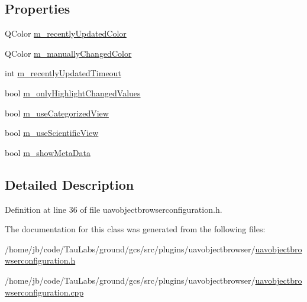 \subsection*{\-Properties}
\begin{DoxyCompactItemize}
\item 
\-Q\-Color \hyperlink{group___u_a_v_object_browser_plugin_ga37ba368816fa79530f01aa4447c2fc4d}{m\-\_\-recently\-Updated\-Color}
\item 
\-Q\-Color \hyperlink{group___u_a_v_object_browser_plugin_gaa3a9a8f01c4d49765d9134150e110f42}{m\-\_\-manually\-Changed\-Color}
\item 
int \hyperlink{group___u_a_v_object_browser_plugin_gabdd8aaa583badc5d3c7545480a372138}{m\-\_\-recently\-Updated\-Timeout}
\item 
bool \hyperlink{group___u_a_v_object_browser_plugin_ga71cd3f90f89aecf1db0e52927661c9f4}{m\-\_\-only\-Highlight\-Changed\-Values}
\item 
bool \hyperlink{group___u_a_v_object_browser_plugin_ga5e0ce819c5383cf9b01ec73c887f67f8}{m\-\_\-use\-Categorized\-View}
\item 
bool \hyperlink{group___u_a_v_object_browser_plugin_ga45e17799029628f880291ec2324473a5}{m\-\_\-use\-Scientific\-View}
\item 
bool \hyperlink{group___u_a_v_object_browser_plugin_ga6ae11b3871f2da133017aeffa97aaa0b}{m\-\_\-show\-Meta\-Data}
\end{DoxyCompactItemize}


\subsection{\-Detailed \-Description}


\-Definition at line 36 of file uavobjectbrowserconfiguration.\-h.



\-The documentation for this class was generated from the following files\-:\begin{DoxyCompactItemize}
\item 
/home/jb/code/\-Tau\-Labs/ground/gcs/src/plugins/uavobjectbrowser/\hyperlink{uavobjectbrowserconfiguration_8h}{uavobjectbrowserconfiguration.\-h}\item 
/home/jb/code/\-Tau\-Labs/ground/gcs/src/plugins/uavobjectbrowser/\hyperlink{uavobjectbrowserconfiguration_8cpp}{uavobjectbrowserconfiguration.\-cpp}\end{DoxyCompactItemize}
